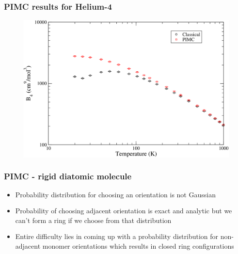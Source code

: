 \documentclass[xcolor=svgnames]{beamer}
\begin{document}
	\begin{frame}
	\frametitle{PIMC results for Helium-4}
	\begin{figure}
	\centering
	\includegraphics[scale=0.2,keepaspectratio]{B4-Kate.png}
	\end{figure}
	\end{frame}

	\begin{frame}
	\frametitle{PIMC - rigid diatomic molecule}
	\begin{itemize}
	\item Probability distribution for choosing an orientation is not Gaussian
	\item Probability of choosing adjacent orientation is exact and analytic but we can't form a ring if we choose from that distribution
	\begin{figure}
	\centering
	\def\svgscale{0.2}
	
	\end{figure}
	\item Entire difficulty lies in coming up with a probability distribution for non-adjacent monomer orientations which results in closed ring configurations
	\begin{figure}
	\centering
	\def\svgscale{0.3}
	
	\end{figure}
	\end{itemize}
	\end{frame}
	
\end{document}
